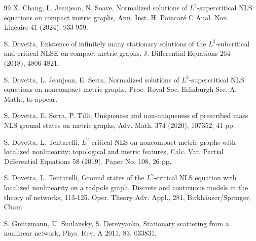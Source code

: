 \documentclass[11pt]{amsart}
\numberwithin{equation}{section}
\begin{document}
\begin{thebibliography}{99}
X. Chang, L. Jeanjean, N. Soave, Normalized solutions of $L^2$-supercritical NLS equations on compact metric graphs, Ann. Inst. H. Poincar\'{e} C Anal. Non Lin\'{e}aire 41 (2024), 933-959.



S. Dovetta, Existence of infinitely many stationary solutions of the $L^2$-subcritical and critical NLSE on compact metric graphs, J. Differential Equations 264 (2018), 4806-4821.

S. Dovetta, L. Jeanjean, E. Serra, Normalized solutions of $L^2$-supercritical NLS equations on noncompact metric graphs, Proc. Royal Soc. Edinburgh Sec. A: Math., to appear.

S. Dovetta, E. Serra, P. Tilli, Uniqueness and non-uniqueness of prescribed mass NLS ground states on metric graphs, Adv. Math. 374 (2020), 107352, 41 pp.

S. Dovetta, L. Tentarelli, $L^2$-critical NLS on noncompact metric graphs with localized nonlinearity: topological and metric features,  Calc. Var. Partial Differential Equations 58 (2019), Paper No. 108, 26 pp.

S. Dovetta, L. Tentarelli, Ground states of the $L^2$-critical NLS equation with localized nonlinearity on a tadpole graph, Discrete and continuous models in the theory of networks, 113-125. Oper. Theory Adv. Appl., 281, Birkh\"{a}user/Springer, Cham.




S. Gnutzmann, U. Smilansky, S. Derevyanko, Stationary scattering from a nonlinear network, Phys. Rev. A 2011, 83, 033831.


\end{thebibliography}
\end{document}
